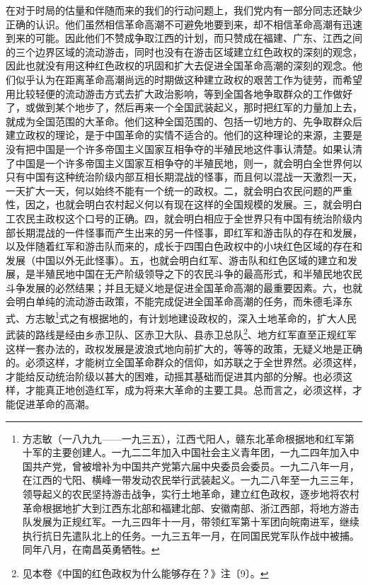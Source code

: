 \documentclass[cn,11pt,chinese]{elegantbook}
\begin{document}
在对于时局的估量和伴随而来的我们的行动问题上，我们党内有一部分同志还缺少正确的认识。他们虽然相信革命高潮不可避免地要到来，却不相信革命高潮有迅速到来的可能。因此他们不赞成争取江西的计划，而只赞成在福建、广东、江西之间的三个边界区域的流动游击，同时也没有在游击区域建立红色政权的深刻的观念，因此也就没有用这种红色政权的巩固和扩大去促进全国革命高潮的深刻的观念。他们似乎认为在距离革命高潮尚远的时期做这种建立政权的艰苦工作为徒劳，而希望用比较轻便的流动游击方式去扩大政治影响，等到全国各地争取群众的工作做好了，或做到某个地步了，然后再来一个全国武装起义，那时把红军的力量加上去，就成为全国范围的大革命。他们这种全国范围的、包括一切地方的、先争取群众后建立政权的理论，是于中国革命的实情不适合的。他们的这种理论的来源，主要是没有把中国是一个许多帝国主义国家互相争夺的半殖民地这件事认清楚。如果认清了中国是一个许多帝国主义国家互相争夺的半殖民地，则一，就会明白全世界何以只有中国有这种统治阶级内部互相长期混战的怪事，而且何以混战一天激烈一天，一天扩大一天，何以始终不能有一个统一的政权。二，就会明白农民问题的严重性，因之，也就会明白农村起义何以有现在这样的全国规模的发展。三，就会明白工农民主政权这个口号的正确。四，就会明白相应于全世界只有中国有统治阶级内部长期混战的一件怪事而产生出来的另一件怪事，即红军和游击队的存在和发展，以及伴随着红军和游击队而来的，成长于四围白色政权中的小块红色区域的存在和发展（中国以外无此怪事）。五，也就会明白红军、游击队和红色区域的建立和发展，是半殖民地中国在无产阶级领导之下的农民斗争的最高形式，和半殖民地农民斗争发展的必然结果；并且无疑义地是促进全国革命高潮的最重要因素。六，也就会明白单纯的流动游击政策，不能完成促进全国革命高潮的任务，而朱德毛泽东式、方志敏\footnote[1]{ 方志敏（一八九九——一九三五），江西弋阳人，赣东北革命根据地和红军第十军的主要创建人。一九二二年加入中国社会主义青年团，一九二四年加入中国共产党，曾被增补为中国共产党第六届中央委员会委员。一九二八年一月，在江西的弋阳、横峰一带发动农民举行武装起义。一九二八年至一九三三年，领导起义的农民坚持游击战争，实行土地革命，建立红色政权，逐步地将农村革命根据地扩大到江西东北部和福建北部、安徽南部、浙江西部，将地方游击队发展为正规红军。一九三四年十一月，带领红军第十军团向皖南进军，继续执行抗日先遣队北上的任务。一九三五年一月，在同国民党军队作战中被捕。同年八月，在南昌英勇牺牲。}式之有根据地的，有计划地建设政权的，深入土地革命的，扩大人民武装的路线是经由乡赤卫队、区赤卫大队、县赤卫总队\footnote[2]{ 见本卷《中国的红色政权为什么能够存在？》注〔9〕。}、地方红军直至正规红军这样一套办法的，政权发展是波浪式地向前扩大的，等等的政策，无疑义地是正确的。必须这样，才能树立全国革命群众的信仰，如苏联之于全世界然。必须这样，才能给反动统治阶级以甚大的困难，动摇其基础而促进其内部的分解。也必须这样，才能真正地创造红军，成为将来大革命的主要工具。总而言之，必须这样，才能促进革命的高潮。\\
\end{document}
